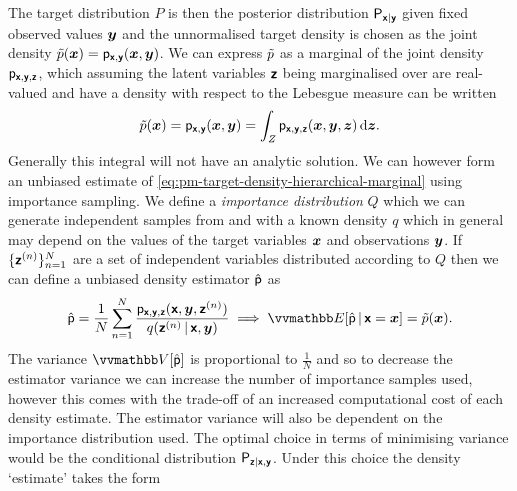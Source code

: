 The target distribution $P$ is then the posterior distribution $\mathsf{P}_{\boldsymbol{\mathsf{x}}|\boldsymbol{\mathsf{y}}}$ given fixed observed values $\boldsymbol{y}$ and the unnormalised target density is chosen as the joint density $\tilde{p}(\boldsymbol{x}) = \mathsf{p}_{\boldsymbol{\mathsf{x}},\boldsymbol{\mathsf{y}}}(\boldsymbol{x},\boldsymbol{y})$. We can express $\tilde{p}$ as a marginal of the joint density $\mathsf{p}_{\boldsymbol{\mathsf{x}},\boldsymbol{\mathsf{y}},\boldsymbol{\mathsf{z}}}$, which assuming the latent variables $\boldsymbol{\mathsf{z}}$ being marginalised over are real-valued and have a density with respect to the Lebesgue measure can be written
\begin{equation}\label{eq:pm-target-density-hierarchical-marginal}
  \tilde{p}(\boldsymbol{x}) = \mathsf{p}_{\boldsymbol{\mathsf{x}},\boldsymbol{\mathsf{y}}}(\boldsymbol{x},\boldsymbol{y}) =
  \int_{\mathit{Z}} \mathsf{p}_{\boldsymbol{\mathsf{x}},\boldsymbol{\mathsf{y}},\boldsymbol{\mathsf{z}}}(\boldsymbol{x},\boldsymbol{y},\boldsymbol{z}) \,\mathrm{d}\boldsymbol{z}.
\end{equation}
Generally this integral will not have an analytic solution. We can however form an unbiased estimate of \eqref{eq:pm-target-density-hierarchical-marginal} using importance sampling. We define a \emph{importance distribution} $Q$ which we can generate independent samples from and with a known density $q$ which in general may depend on the values of the target variables $\boldsymbol{x}$ and observations $\boldsymbol{y}$. If $\lbrace \boldsymbol{\mathsf{z}}^{(n)} \rbrace_{n=1}^N$ are a set of independent variables distributed according to $Q$ then we can define a unbiased density estimator $\hat{\mathsf{p}}$ as
\begin{equation}\label{eq:pm-hierarchical-model-importance-sampling-estimator}
  \hat{\rvar{p}} = \frac{1}{N} \sum_{n=1}^N \frac{\pden{\rvct{x},\rvct{y},\rvct{z}}(\rvct{x},\vct{y},\rvct{z}^{(n)})}{q(\rvct{z}^{(n)}\gvn\rvct{x},\vct{y})} \implies
  \expc{\hat{\rvar{p}}\gvn\rvct{x} = \vct{x}} = \utgtdens(\vct{x}).
\end{equation}
The variance $\var{\hat{\rvar{p}}}$ is proportional to $\frac{1}{N}$ and so to decrease the estimator variance we can increase the number of importance samples used, however this comes with the trade-off of an increased computational cost of each density estimate. The estimator variance will also be dependent on the importance distribution used. The optimal choice in terms of minimising variance would be the conditional distribution $\mathsf{P}_{\boldsymbol{\mathsf{z}}|\boldsymbol{\mathsf{x}},\boldsymbol{\mathsf{y}}}$. Under this choice the density `estimate' takes the form

